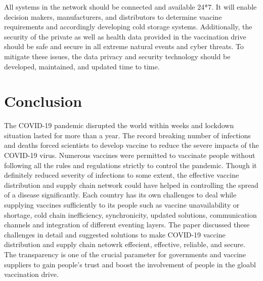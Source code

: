 \documentclass{article}
\begin{document}
All systems in the network should be connected and available 24*7. It will enable decision makers, manufacturers, and distributors to determine vaacine requirements and accordingly developing cold storage systems. Additionally, the security of the private as well as health data provided in the vaccination drive should be safe and secure in all extreme natural events and cyber threats. To mitigate these issues, the data privacy and security technology should be developed, maintained, and updated time to time.  
  
\section{Conclusion}
The COVID-19 pandemic disrupted the world within weeks and lockdown situation lasted for more than a year. The record breaking number of infections and deaths forced scientists to develop vaccine to reduce the severe impacts of the COVID-19 virus. Numerous vaccines were permitted to vaccinate people without following all the rules and regulations strictly to control the pandemic. Though it definitely reduced severity of infections to some extent, the effective vaccine distribution and supply chain network could have helped in controlling the spread of a disease significantly. Each country has its own challenges to deal while supplying vaccines sufficiently to its people such as vaccine unavailability or shortage, cold chain inefficiency, synchronicity, updated solutions, communication channels and integration of different eventing layers. The paper discussed these challenges in detail and suggested solutions to make COVID-19 vaccine distribution and supply chain netowrk effecient, effective, reliable, and secure. The transparency is one of the crucial parameter for governments and vaccine suppliers to gain people's trust and boost the involvement of people in the gloabl vaccination drive.    



\end{document}
